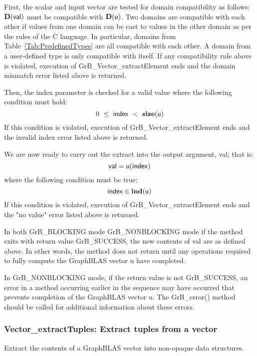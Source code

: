 First, the scalar and input vector are tested for domain compatibility as follows:
$\mathbf{D}({\sf val})$ must be compatible with $\mathbf{D}({\sf u})$. Two domains 
are compatible with each other if values from one domain can be cast to values 
in the other domain as per the rules of the C language. In particular, domains 
from Table~\ref{Tab:PredefinedTypes} are all compatible with each other. A domain 
from a user-defined type is only compatible with itself. If any compatibility 
rule above is violated, execution of {\sf GrB\_Vector\_extractElement} ends and 
the domain mismatch error listed above is returned.

Then, the {\sf index} parameter is checked for a valid value where the following
condition must hold:
\[
	0\ \leq\ {\sf index}\ <\ \mathbf{size}({\sf u})
\]
If this condition is violated, execution of {\sf GrB\_Vector\_extractElement} 
ends and the invalid index error listed above is returned.

We are now ready to carry out the extract into the output argument, {\sf val};  
that is:
\[
    {\sf val} = {\sf u}({\sf index})
\]
where the following condition must be true:
\[
    {\sf index} \in \mathbf{ind}({\sf u})
\]
If this condition is violated, execution of {\sf GrB\_Vector\_extractElement} 
ends and the "no value" error listed above is returned.

In both {\sf GrB\_BLOCKING} mode {\sf GrB\_NONBLOCKING} mode
if the method exits with return value {\sf GrB\_SUCCESS}, the  new 
contents of {\sf val} are as defined above.  In other words, the method
does not return until any operations required to fully compute 
the GraphBLAS vector {\sf u} have completed. 

In {\sf GrB\_NONBLOCKING} mode, if the return value is 
not {\sf GrB\_SUCCESS}, an error in a method occurring earlier in the sequence
may have occurred that prevents completion of the GraphBLAS vector {\sf u}.
The {\sf GrB\_error()} method should be called for additional information 
about these errors.



\subsubsection{{\sf Vector\_extractTuples}: Extract tuples from a vector}
\label{Sec:Vector_extractTuples}

Extract the contents of a GraphBLAS vector into non-opaque data structures.

